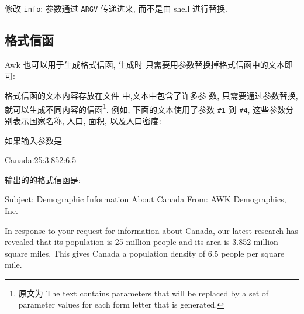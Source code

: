 \begin{exercise}
    \label{exer:info}
    修改 \texttt{info}: 参数通过 \texttt{ARGV} 传递进来, 而不是由 shell 
    进行替换.
\end{exercise}

\subsection{格式信函}
\label{subsec:form_letters}

Awk 也可以用于生成格式信函, 生成时
只需要用参数替换掉格式信函中的文本即可:
\begin{center}
\end{center}
格式信函的文本内容存放在文件  中,文本中包含了许多参
数, 只需要通过参数替换, 就可以生成不同内容的信函\footnote{原文为 The text
    contains parameters that will be replaced by a set of parameter values
for each form letter that is generated.}. 例如, 下面的文本使用了参数 
\verb'#1' 到 \verb'#4', 这些参数分别表示国家名称, 人口, 面积, 以及人口密度:

如果输入参数是
\begin{awkcode}
    Canada:25:3.852:6.5
\end{awkcode}
输出的的格式信函是:
\begin{awkcode}
    Subject: Demographic Information About Canada
    From: AWK Demographics, Inc.

    In response to your request for information about Canada,
    our latest research has revealed that its population is 25
    million people and its area is 3.852 million square miles.
    This gives Canada a population density of 6.5 people per
    square mile.
\end{awkcode}

